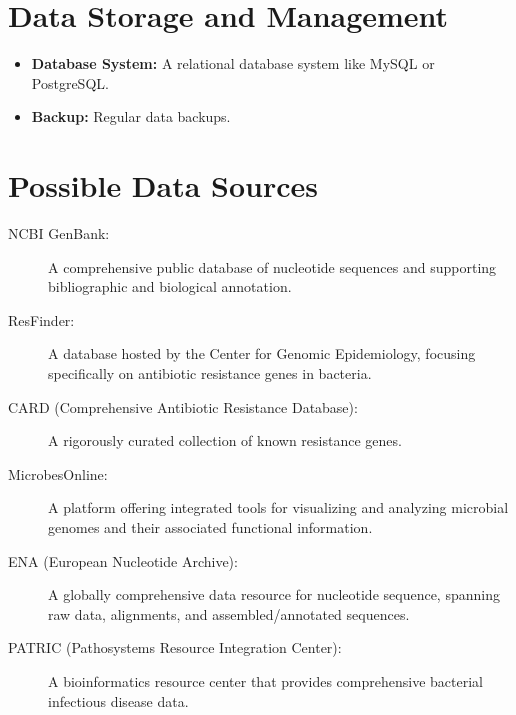\documentclass[12pt]{article}
\begin{document}
\section{Data Storage and Management}
\begin{itemize}
    \item \textbf{Database System:} A relational database system like MySQL or PostgreSQL.
    \item \textbf{Backup:} Regular data backups.
\end{itemize}

\section{Possible Data Sources}
\begin{description}
    \item[NCBI GenBank:] A comprehensive public database of nucleotide sequences and supporting bibliographic and biological annotation.
    \item[ResFinder:] A database hosted by the Center for Genomic Epidemiology, focusing specifically on antibiotic resistance genes in bacteria.
    \item[CARD (Comprehensive Antibiotic Resistance Database):] A rigorously curated collection of known resistance genes.
    \item[MicrobesOnline:] A platform offering integrated tools for visualizing and analyzing microbial genomes and their associated functional information.
    \item[ENA (European Nucleotide Archive):] A globally comprehensive data resource for nucleotide sequence, spanning raw data, alignments, and assembled/annotated sequences.
    \item[PATRIC (Pathosystems Resource Integration Center):] A bioinformatics resource center that provides comprehensive bacterial infectious disease data.
\end{description}
\end{document}
